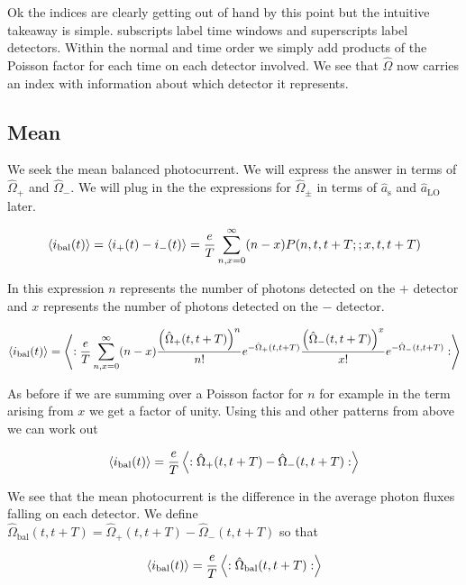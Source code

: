 \documentclass[12pt]{article}
\begin{document}
Ok the indices are clearly getting out of hand by this point but the intuitive takeaway is simple. subscripts label time windows and superscripts label detectors. Within the normal and time order we simply add products of the Poisson factor for each time on each detector involved. We see that $\hat{\Omega}$ now carries an index with information about which detector it represents.


\subsection{Mean}
We seek the mean balanced photocurrent. We will express the answer in terms of $\hat{\Omega}_+$ and $\hat{\Omega}_-$. We will plug in the the expressions for $\hat{\Omega}_{\pm}$ in terms of $\hat{a}_{\text{s}}$ and $\hat{a}_{\text{LO}}$ later.

\begin{align}
\Braket{i_{\text{bal}}(t)} = \Braket{i_+(t) - i_-(t)} = \frac{e}{T}\sum_{n,x=0}^{\infty} (n-x) P(n,t,t+T;;x,t,t+T)
\end{align}

In this expression $n$ represents the number of photons detected on the $+$ detector and $x$ represents the number of photons detected on the $-$ detector.

\begin{align}
\Braket{i_{\text{bal}}(t)} = \Braket{:\frac{e}{T}\sum_{n,x=0}^{\infty} (n-x) \frac{\left(\hat{\Omega}_+(t,t+T)\right)^n}{n!} e^{-\hat{\Omega}_+(t,t+T)}\frac{\left(\hat{\Omega}_-(t,t+T)\right)^x}{x!} e^{-\hat{\Omega}_-(t,t+T)}:}
\end{align}

As before if we are summing over a Poisson factor for $n$ for example in the term arising from $x$ we get a factor of unity. Using this and other patterns from above we can work out

\begin{align}
\Braket{i_{\text{bal}}(t)} = \frac{e}{T}\Braket{:\hat{\Omega}_+(t,t+T) - \hat{\Omega}_-(t,t+T):}
\end{align}

We see that the mean photocurrent is the difference in the average photon fluxes falling on each detector. We define $\hat{\Omega}_{\text{bal}}(t,t+T) = \hat{\Omega}_+(t,t+T) - \hat{\Omega}_-(t,t+T)$ so that

\begin{align}
\Braket{i_{\text{bal}}(t)} = \frac{e}{T}\Braket{:\hat{\Omega}_{\text{bal}}(t,t+T):}
\end{align}
\end{document}
